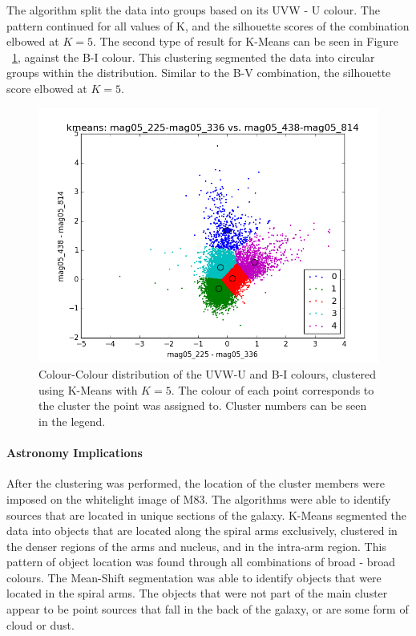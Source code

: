 The algorithm split the data into groups based on its UVW - U colour. The pattern continued for all values of K, and the silhouette scores of the combination elbowed at $K=5$.
The second type of result for K-Means can be seen in Figure ~\ref{fig:UVWKM2}, against the B-I colour. 
This clustering segmented the data into circular groups within the distribution. 
Similar to the B-V combination, the silhouette score elbowed at $K=5$.

\begin{figure}[H]
\centering
\includegraphics[width=\linewidth]{figs/kmeans_xy_5cl_mag05_225-mag05_336vsmag05_438-mag05_814}
\caption{Colour-Colour distribution of the UVW-U and B-I colours, clustered using K-Means with $K=5$. The colour of each point corresponds to the cluster the point was assigned to. Cluster numbers can be seen in the legend.}
\label{fig:UVWKM2}
\end{figure}

\paragraph{Astronomy Implications}
After the clustering was performed, the location of the cluster members were imposed on the whitelight image of M83.
The algorithms were able to identify sources that are located in unique sections of the galaxy.
K-Means segmented the data into objects that are located along the spiral arms exclusively, clustered in the denser regions of the arms and nucleus, and in the intra-arm region.
This pattern of object location was found through all combinations of broad - broad colours.
The Mean-Shift segmentation was able to identify objects that were located in the spiral arms.
The objects that were not part of the main cluster appear to be point sources that fall in the back of the galaxy, or are some form of cloud or dust.



